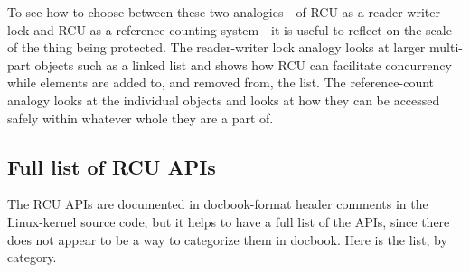To see how to choose between these two analogies---of RCU as a
reader-writer lock and RCU as a reference counting system---it is useful
to reflect on the scale of the thing being protected.
The reader-writer
lock analogy looks at larger multi-part objects such as a linked list
and shows how RCU can facilitate concurrency while elements are added
to, and removed from, the list.
The reference-count analogy looks at
the individual objects and looks at how they can be accessed safely
within whatever whole they are a part of.


\subsection{Full list of RCU APIs}
\label{sec:rcu:Full list of RCU APIs}

The RCU APIs are documented in docbook-format header comments in the
Linux-kernel source code, but it helps to have a full list of the
APIs, since there does not appear to be a way to categorize them
in docbook.  Here is the list, by category.

